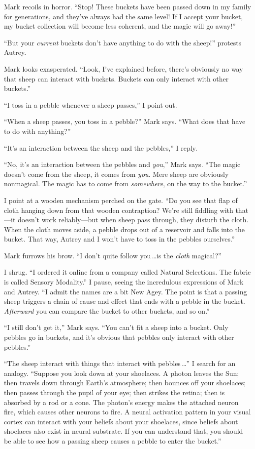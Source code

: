 {
 Mark recoils in horror. ``Stop! These buckets
have been passed down in my family for generations, and
they've always had the same level! If I accept your
bucket, my bucket collection will become less coherent, and the magic
will go away!''}

{
 ``But your \textit{current} buckets
don't have anything to do with the
sheep!'' protests Autrey.}

{
 Mark looks exasperated. ``Look,
I've explained before, there's
obviously no way that sheep can interact with buckets. Buckets can only
interact with other buckets.''}

{
 ``I toss in a pebble whenever a sheep
passes,'' I point out.}

{
 ``When a sheep passes, you toss in a
pebble?'' Mark says. ``What does
that have to do with anything?''}

{
 ``It's an interaction between the
sheep and the pebbles,'' I reply.}

{
 ``No, it's an interaction between
the pebbles and \textit{you},'' Mark says.
``The magic doesn't come from the
sheep, it comes from \textit{you}. Mere sheep are obviously nonmagical.
The magic has to come from \textit{somewhere}, on the way to the
bucket.''}

{
 I point at a wooden mechanism perched on the gate.
``Do you see that flap of cloth hanging down from that
wooden contraption? We're still fiddling with that---it
doesn't work reliably---but when sheep pass through,
they disturb the cloth. When the cloth moves aside, a pebble drops out
of a reservoir and falls into the bucket. That way, Autrey and I
won't have to toss in the pebbles
ourselves.''}

{
 Mark furrows his brow. ``I don't
quite follow you\,\ldots is the \textit{cloth}
magical?''}

{
 I shrug. ``I ordered it online from a company
called Natural Selections. The fabric is called Sensory
Modality.'' I pause, seeing the incredulous
expressions of Mark and Autrey. ``I admit the names
are a bit New Agey. The point is that a passing sheep triggers a chain
of cause and effect that ends with a pebble in the bucket.
\textit{Afterward} you can compare the bucket to other buckets, and so
on.''}

{
 ``I still don't get
it,'' Mark says. ``You
can't fit a sheep into a bucket. Only pebbles go in
buckets, and it's obvious that pebbles only interact
with other pebbles.''}

{
 ``The sheep interact with things that interact
with pebbles\,\ldots'' I search for an analogy.
``Suppose you look down at your shoelaces. A photon
leaves the Sun; then travels down through Earth's
atmosphere; then bounces off your shoelaces; then passes through the
pupil of your eye; then strikes the retina; then is absorbed by a rod
or a cone. The photon's energy makes the attached
neuron fire, which causes other neurons to fire. A neural activation
pattern in your visual cortex can interact with your beliefs about your
shoelaces, since beliefs about shoelaces also exist in neural
substrate. If you can understand that, you should be able to see how a
passing sheep causes a pebble to enter the bucket.''}

